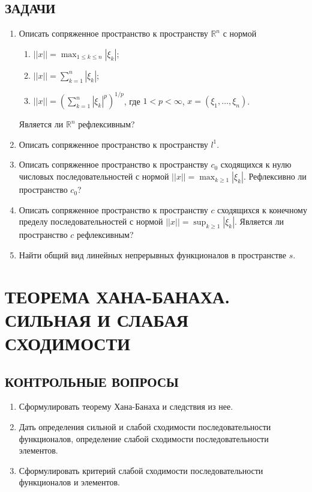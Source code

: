 \documentclass[12pt,a4paper]{article}
\begin{document}
\subsection*{ЗАДАЧИ}
\begin{enumerate}
\item Описать сопряженное пространство к пространству $\mathbb{R}^{n}$ с нормой
\begin{enumerate}[label=\alph*)]
\item $||x|| = \max_{1 \le k \le n} |\xi_{k}|$;
\item $||x|| = \sum_{k=1}^{n} |\xi_{k}|$;
\item $||x|| = (\sum_{k=1}^{n} |\xi_{k}|^{p})^{1/p}$, где $1 < p < \infty$, $x = (\xi_{1}, \dots, \xi_{n})$.
\end{enumerate}
Является ли $\mathbb{R}^{n}$ рефлексивным?

\item Описать сопряженное пространство к пространству $l^{1}$.

\item Описать сопряженное пространство к пространству $c_{0}$ сходящихся к нулю числовых последовательностей с нормой $||x|| = \max_{k \ge 1} |\xi_{k}|$. Рефлексивно ли пространство $c_{0}$?

\item Описать сопряженное пространство к пространству $c$ сходящихся к конечному пределу последовательностей с нормой $||x|| = \sup_{k \ge 1} |\xi_{k}|$. Является ли пространство $c$ рефлексивным?

\item Найти общий вид линейных непрерывных функционалов в пространстве $s$.
\end{enumerate}

\section{ТЕОРЕМА ХАНА-БАНАХА. СИЛЬНАЯ И СЛАБАЯ СХОДИМОСТИ}

\subsection*{КОНТРОЛЬНЫЕ ВОПРОСЫ}
\begin{enumerate}
\item Сформулировать теорему Хана-Банаха и следствия из нее.
\item Дать определения сильной и слабой сходимости последовательности функционалов, определение слабой сходимости последовательности элементов.
\item Сформулировать критерий слабой сходимости последовательности функционалов и элементов.
\end{enumerate}
\end{document}

